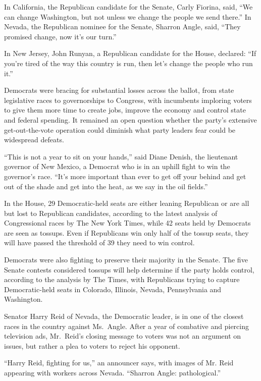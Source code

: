 ﻿\documentclass[12pt]{article}
\begin{document}
In California, the Republican candidate for the Senate, Carly Fiorina, said, ``We can change
Washington, but not unless we change the people we send there.'' In Nevada, the Republican nominee
for the Senate, Sharron Angle, said, ``They promised change, now it's our turn.''

In New Jersey, John Runyan, a Republican candidate for the House, declared: ``If you're tired of the
way this country is run, then let's change the people who run it.''

Democrats were bracing for substantial losses across the ballot, from state legislative races to
governorships to Congress, with incumbents imploring voters to give them more time to create jobs,
improve the economy and control state and federal spending. It remained an open question whether the
party's extensive get-out-the-vote operation could diminish what party leaders fear could be
widespread defeats.

``This is not a year to sit on your hands,'' said Diane Denish, the lieutenant governor of New
Mexico, a Democrat who is in an uphill fight to win the governor's race. ``It's more important than
ever to get off your behind and get out of the shade and get into the heat, as we say in the oil
fields.''

In the House, 29 Democratic-held seats are either leaning Republican or are all but lost to
Republican candidates, according to the latest analysis of Congressional races by The New York
Times, while 42 seats held by Democrats are seen as tossups. Even if Republicans win only half of
the tossup seats, they will have passed the threshold of 39 they need to win control.

Democrats were also fighting to preserve their majority in the Senate. The five Senate contests
considered tossups will help determine if the party holds control, according to the analysis by The
Times, with Republicans trying to capture Democratic-held seats in Colorado, Illinois, Nevada,
Pennsylvania and Washington.

Senator Harry Reid of Nevada, the Democratic leader, is in one of the closest races in the country
against Ms.~Angle. After a year of combative and piercing television ads, Mr.~Reid's closing message
to voters was not an argument on issues, but rather a plea to voters to reject his opponent.

``Harry Reid, fighting for us,'' an announcer says, with images of Mr. Reid appearing with workers
across Nevada. ``Sharron Angle: pathological.''
\end{document}
